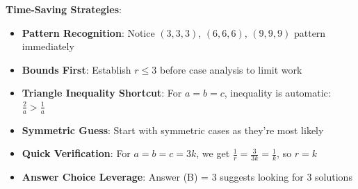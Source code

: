 \documentclass[12pt]{article}
\begin{document}
\begin{protip}
\textbf{Time-Saving Strategies}:
\begin{itemize}
    \item \textbf{Pattern Recognition}: Notice $(3, 3, 3)$, $(6, 6, 6)$, $(9, 9, 9)$ pattern immediately
    \item \textbf{Bounds First}: Establish $r \leq 3$ before case analysis to limit work
    \item \textbf{Triangle Inequality Shortcut}: For $a = b = c$, inequality is automatic: $\frac{2}{a} > \frac{1}{a}$
    \item \textbf{Symmetric Guess}: Start with symmetric cases as they're most likely
    \item \textbf{Quick Verification}: For $a = b = c = 3k$, we get $\frac{1}{r} = \frac{3}{3k} = \frac{1}{k}$, so $r = k$
    \item \textbf{Answer Choice Leverage}: Answer (B) = 3 suggests looking for 3 solutions
\end{itemize}
\end{protip}
\end{document}
